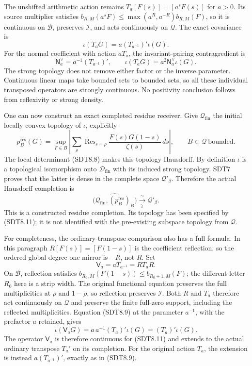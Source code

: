 The unshifted arithmetic action remains \(T_a[F(s)]=[a^sF(s)]\) for
\(a>0\). Its source multiplier satisfies
\(b_{R,M}(a^sF)\le\max(a^R,a^{-R})b_{R,M}(F)\), so it is continuous on
\(\mathcal B\), preserves \(\mathcal I\), and acts continuously on
\(\mathcal Q\). The exact covariance is \[
\iota(T_aG)=a(T_{a^{-1}})'\iota(G).
\tag{SDT8.9}
\] For the normal coefficient with action \(aT_a\), the
invariant-pairing contragredient is \[
\mathsf N_a^\vee=a^{-1}(T_{a^{-1}})',\qquad
\iota(T_aG)=a^2\mathsf N_a^\vee\iota(G).
\tag{SDT8.10}
\] The strong topology does not remove either factor or the inverse
parameter. Continuous linear maps take bounded sets to bounded sets, so
all these individual transposed operators are strongly continuous. No
positivity conclusion follows from reflexivity or strong density.

One can now construct an exact completed residue receiver. Give
\(\mathcal Q_{\mathrm{fin}}\) the initial locally convex topology of
\(\iota\), explicitly \[
p_B^{\mathrm{res}}(G)
=\sup_{F\in B}\left|
\sum_\rho\operatorname{Res}_{s=\rho}
\frac{F(s)G(1-s)}{\zeta(s)}\,ds\right|,
\qquad B\subset\mathcal Q\ \text{bounded}.
\tag{SDT8.11}
\] The local determinant (SDT8.8) makes this topology Hausdorff. By
definition \(\iota\) is a topological isomorphism onto
\(\mathscr D_{\mathrm{fin}}\) with its induced strong topology. SDT7
proves that the latter is dense in the complete space
\(\mathcal Q'_\beta\). Therefore the actual Hausdorff completion is \[
\boxed{
\widehat{\bigl(\mathcal Q_{\mathrm{fin}},
(p_B^{\mathrm{res}})_B\bigr)}
\xrightarrow[\ \widehat\iota\ ]{\ \sim\ }\mathcal Q'_\beta.}
\tag{SDT8.12}
\] This is a constructed residue completion. Its topology has been
specified by (SDT8.11); it is not identified with the pre-existing
subspace topology from \(\mathcal Q\).

For completeness, the ordinary-transpose comparison also has a full
formula. In this paragraph \(R[F(s)]=[F(1-s)]\) is the coefficient
reflection, so the ordered global degree-one mirror is \(-R\), not
\(R\). Set \[
\mathsf V_a=aT_{a^{-1}}=RT_aR.
\tag{SDT8.13}
\] On \(\mathcal B\), reflection satisfies
\(b_{R_0,M}(F(1-s))\le b_{R_0+1,M}(F)\); the different letter \(R_0\)
here is a strip width. The original functional equation preserves the
full multiplicities at \(\rho\) and \(1-\rho\), so reflection preserves
\(\mathcal I\). Both \(R\) and \(T_a\) therefore act continuously on
\(\mathcal Q\) and preserve the finite full-zero support, including the
reflected multiplicities. Equation (SDT8.9) at the parameter \(a^{-1}\),
with the prefactor \(a\) retained, gives \[
\iota(\mathsf V_aG)
=a\,a^{-1}(T_a)'\iota(G)
=(T_a)'\iota(G).
\tag{SDT8.14}
\] The operator \(\mathsf V_a\) is therefore continuous for (SDT8.11)
and extends to the actual ordinary transpose \(T_a'\) on its completion.
For the original action \(T_a\), the extension is instead
\(a(T_{a^{-1}})'\), exactly as in (SDT8.9).


